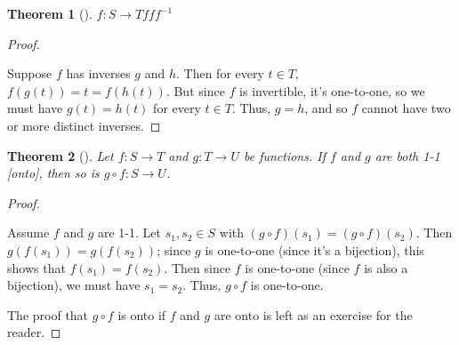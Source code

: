 \documentclass[10pt,]{book}
\theoremstyle{plain}
\newtheorem{theorem}{Theorem}[section]
\theoremstyle{definition}
\theoremstyle{definition}
\theoremstyle{definition}
\theoremstyle{definition}
\numberwithin{equation}{section}
\begin{document}
\begin{theorem}[{}]\label{theorem-2}
\(f:S\to T\)\(f\)\(f\)\(f^{-1}\)\label{notation-26}
\end{theorem}
\begin{proof}\hypertarget{proof-2}{}
Suppose \(f\) has inverses \(g\) and \(h\). Then for every \(t\in T,\) \(f(g(t))=t=f(h(t))\). But since \(f\) is invertible, it's one-to-one, so we must have \(g(t)=h(t)\) for every \(t\in T\). Thus, \(g=h\), and so \(f\) cannot have two or more distinct inverses.%
\end{proof}
\begin{theorem}[{}]\label{compbij}
Let \(f:S\to T\) and \(g:T\to U\) be functions. If \(f\) and \(g\) are both 1-1 [onto], then so is \(g\circ f: S\to U\).%
\end{theorem}
\begin{proof}\hypertarget{proof-3}{}
Assume \(f\) and \(g\) are 1-1. Let \(s_1, s_2\in S\) with \((g\circ f)(s_1)=(g\circ f)(s_2)\). Then \(g(f(s_1))=g(f(s_2))\); since \(g\) is one-to-one (since it's a bijection), this shows that \(f(s_1)=f(s_2)\). Then since \(f\) is one-to-one (since \(f\) is also a bijection), we must have \(s_1=s_2\). Thus, \(g\circ f\) is one-to-one.%
\par
The proof that \(g\circ f\) is onto if \(f\) and \(g\) are onto is left as an exercise for the reader.%
\end{proof}
\typeout{************************************************}
\typeout{************************************************}
\end{document}
